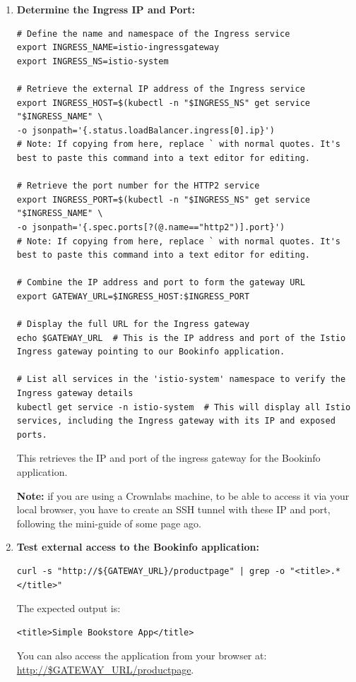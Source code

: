\documentclass{article}
\begin{document}
\begin{enumerate}
    \item \textbf{Determine the Ingress IP and Port:}
    \begin{lstlisting}
# Define the name and namespace of the Ingress service
export INGRESS_NAME=istio-ingressgateway
export INGRESS_NS=istio-system

# Retrieve the external IP address of the Ingress service
export INGRESS_HOST=$(kubectl -n "$INGRESS_NS" get service "$INGRESS_NAME" \
-o jsonpath='{.status.loadBalancer.ingress[0].ip}')
# Note: If copying from here, replace ` with normal quotes. It's best to paste this command into a text editor for editing.

# Retrieve the port number for the HTTP2 service
export INGRESS_PORT=$(kubectl -n "$INGRESS_NS" get service "$INGRESS_NAME" \
-o jsonpath='{.spec.ports[?(@.name=="http2")].port}')
# Note: If copying from here, replace ` with normal quotes. It's best to paste this command into a text editor for editing.

# Combine the IP address and port to form the gateway URL
export GATEWAY_URL=$INGRESS_HOST:$INGRESS_PORT

# Display the full URL for the Ingress gateway
echo $GATEWAY_URL  # This is the IP address and port of the Istio Ingress gateway pointing to our Bookinfo application.

# List all services in the 'istio-system' namespace to verify the Ingress gateway details
kubectl get service -n istio-system  # This will display all Istio services, including the Ingress gateway with its IP and exposed ports.
    \end{lstlisting}

    This retrieves the IP and port of the ingress gateway for the Bookinfo application.

    \textbf{Note:} if you are using a Crownlabs machine, to be able to access it via your local browser, you have to create an SSH tunnel with these IP and port, following the mini-guide of some page ago.

    \item \textbf{Test external access to the Bookinfo application:}
    \begin{lstlisting}
curl -s "http://${GATEWAY_URL}/productpage" | grep -o "<title>.*</title>"
    \end{lstlisting}
    The expected output is:
    \begin{lstlisting}
<title>Simple Bookstore App</title>
    \end{lstlisting}
    You can also access the application from your browser at: \url{http://$GATEWAY_URL/productpage}.
\end{enumerate}
\end{document}
